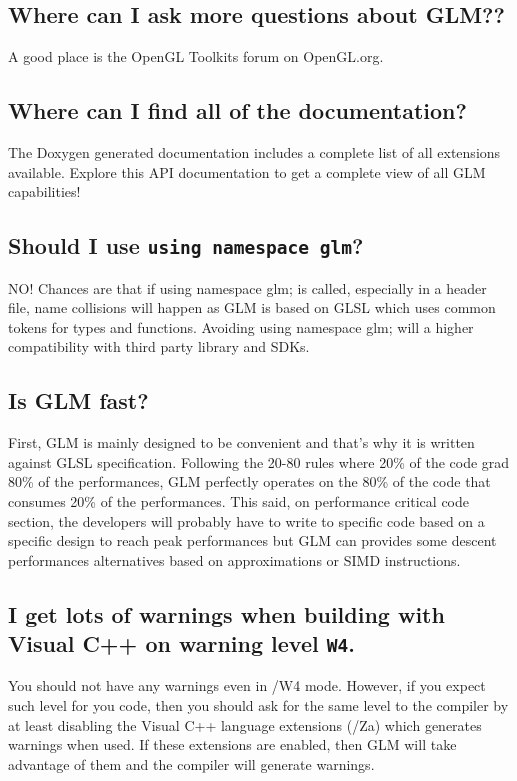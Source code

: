 \documentclass{scrartcl}
\numberwithin{figure}{subsection}
\begin{document}
\subsection{Where can I ask more questions about GLM??}

A good place is the OpenGL Toolkits forum on OpenGL.org.

\subsection{Where can I find all of the documentation?}

The Doxygen generated documentation includes a complete list of all extensions available. Explore this API documentation to get a complete view of all GLM capabilities!

\subsection{Should I use \texttt{using namespace glm}?}

NO! Chances are that if using namespace glm; is called, especially in a header file, name collisions will happen as GLM is based on GLSL which uses common tokens for types and functions. Avoiding using namespace glm; will a higher compatibility with third party library and SDKs.

\subsection{Is GLM fast?}

First, GLM is mainly designed to be convenient and that's why it is written against GLSL specification. Following the 20-80 rules where 20\% of the code grad 80\% of the performances, GLM perfectly operates on the 80\% of the code that consumes 20\% of the performances. This said, on performance critical code section, the developers will probably have to write to specific code based on a specific design to reach peak performances but GLM can provides some descent performances alternatives based on approximations or SIMD instructions.

\subsection{I get lots of warnings when building with Visual C++ on warning level \texttt{\/W4}.}

You should not have any warnings even in /W4 mode. However, if you expect such level for you code, then you should ask for the same level to the compiler by at least disabling the Visual C++ language extensions (/Za) which generates warnings when used. If these extensions are enabled, then GLM will take advantage of them and the compiler will generate warnings.
\end{document}
